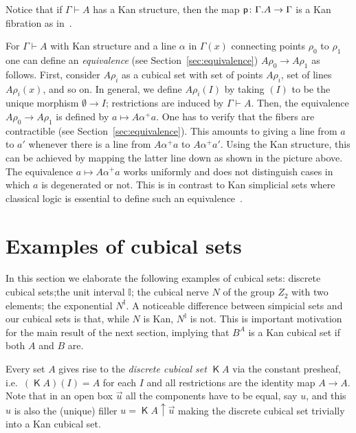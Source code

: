 \documentclass[10pt,a4paper]{article}
\newcommand{\pp}{{\sf p}}
\newcommand{\es}{\emptyset}
\newcommand{\rup}[1]{#1{\uparrow}}
\newcommand{\interval}{\mathbb{I}}
\DeclareMathOperator{\discr}{\mathsf{K}}
\begin{document}
Notice that if $\Gamma \vdash A$ has a Kan structure, then the map
$\pp \colon \Gamma.A \to \Gamma$ is a Kan fibration as in~\cite{Kan,
  Williamson}.

For $\Gamma \vdash A$ with Kan structure and a line $\alpha$ in
$\Gamma (x)$ connecting points $\rho_0$ to $\rho_1$ one can define an
\emph{equivalence} (see Section~\ref{sec:equivalence}) 
$A \rho_0 \to A \rho_1$ as follows.  First, consider $A\rho_i$ as a cubical
set with set of points $A\rho_i$, set of lines $A\rho_i(x)$, and so on.
In general, we define $A\rho_i(I)$ by taking $(I)$ to be the unique 
morphism $\es\to I$; restrictions are induced by $\Gamma \vdash A$.
Then, the equivalence $A \rho_0 \to A \rho_1$ is defined
by $a \mapsto A \alpha^+ a$. One has to verify that the fibers are
contractible (see Section~\ref{sec:equivalence}). This amounts to
giving a line from $a$ to $a'$ whenever there is a line from
$A \alpha^+ a$ to $A \alpha^+ a'$. Using the Kan structure,
this can be achieved by mapping the latter line down as shown in the
picture above. The equivalence $a \mapsto A \alpha^+ a$ works
uniformly and does
not distinguish cases in which $a$ is degenerated or not.
This is in contrast to Kan simplicial sets where classical
logic is essential to define such an equivalence~\cite{BC}.


\section{Examples of cubical sets}\label{sec:examples}
In this section we elaborate the following examples of cubical sets:
discrete cubical sets;the unit interval $\interval$; the cubical nerve
$N$ of the group $Z_2$ with two elements; the exponential
$N^\interval$.  A noticeable difference between simpicial sets and our
cubical sets is that, while $N$ is Kan, $N^\interval$ is not.  This is
important motivation for the main result of the next section, implying
that $B^A$ is a Kan cubical set if both $A$ and $B$ are.

Every set $A$ gives rise to the \emph{discrete cubical set} $\discr A$
via the constant presheaf, i.e.\ $(\discr A) (I) = A$ for each $I$ and
all restrictions are the identity map $A \to A$.  Note that in an open
box $\vec u$ all the components have to be equal, say $u$, and this
$u$ is also the (unique) filler $u = \rup {\discr A} {\vec u}$ making
the discrete cubical set trivially into a Kan cubical set.
\end{document}
